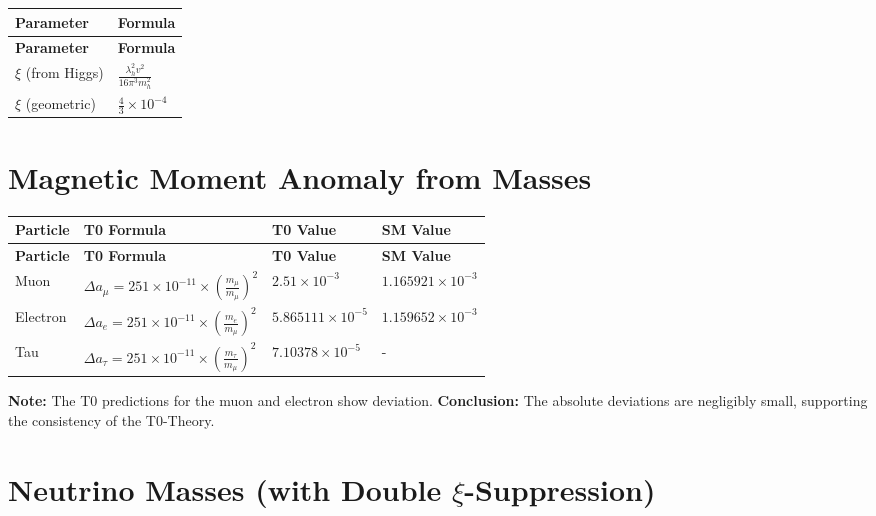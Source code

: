 \documentclass[12pt,a4paper]{article}
\begin{document}
	\begin{longtable}{|p{3cm}|p{5cm}|}
		\hline
		\textbf{Parameter} & \textbf{Formula} \\
		\hline
		\endfirsthead
		\hline
		\textbf{Parameter} & \textbf{Formula} \\
		\hline
		\endhead
		\(\xi\) (from Higgs) & \(\frac{\lambda_h^{2}v^{2}}{16\pi^{3}m_h^{2}}\) \\
		\hline
		\(\xi\) (geometric) & \(\frac{4}{3} \times 10^{-4}\) \\
		\hline
	\end{longtable}
	
	\section{Magnetic Moment Anomaly from Masses}
	
	\begin{longtable}{|p{2.5cm}|p{4.5cm}|p{4cm}|p{3cm}|}
		\hline
		\textbf{Particle} & \textbf{T0 Formula} & \textbf{T0 Value} & \textbf{SM Value} \\
		\hline
		\endfirsthead
		\hline
		\textbf{Particle} & \textbf{T0 Formula} & \textbf{T0 Value} & \textbf{SM Value} \\
		\hline
		\endhead
		Muon & \(\Delta a_{\mu} = 251 \times 10^{-11} \times \left(\frac{m_{\mu}}{m_{\mu}}\right)^{2}\) & \(2.51 \times 10^{-3}\) & \(1.165921 \times 10^{-3}\) \\
		\hline
		Electron & \(\Delta a_{e} = 251 \times 10^{-11} \times \left(\frac{m_{e}}{m_{\mu}}\right)^{2}\) & \(5.865111 \times 10^{-5}\) & \(1.159652 \times 10^{-3}\) \\
		\hline
		Tau & \(\Delta a_{\tau} = 251 \times 10^{-11} \times \left(\frac{m_{\tau}}{m_{\mu}}\right)^{2}\) & \(7.10378 \times 10^{-5}\) & - \\
		\hline
	\end{longtable}
	
	\textbf{Note:} The T0 predictions for the muon and electron show deviation.
	\textbf{Conclusion:} The absolute deviations are negligibly small, supporting the consistency of the T0-Theory.
	
	\section{Neutrino Masses (with Double \(\xi\)-Suppression)}
	
\end{document}
